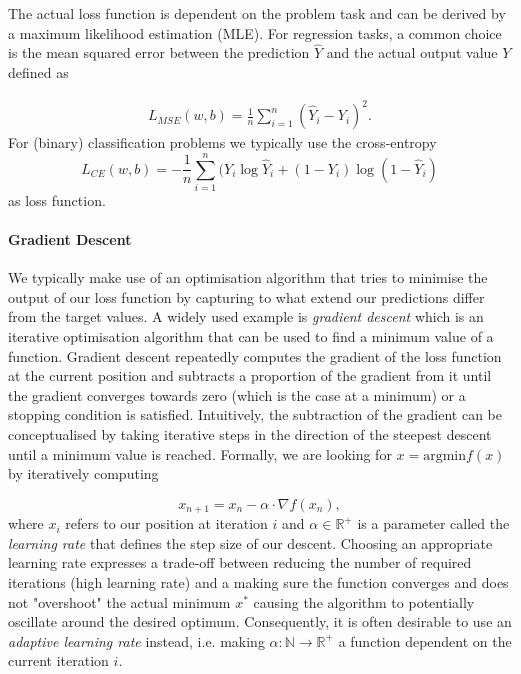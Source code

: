 The actual loss function is dependent on the problem task and can be derived by a maximum likelihood estimation (MLE). For regression tasks, a common choice is the mean squared error between the prediction $\hat{Y}$ and the actual output value $Y$ defined as 


\begin{align} 
L_{MSE}(w,b) = \frac{1}{n} \sum_{i=1}^{n}(\hat{Y}_i - Y_i)^2.
\end{align} 
For (binary) classification problems we typically use the cross-entropy
\begin{equation}
	L_{CE}(w,b) = - \frac{1}{n} \sum_{i=1}^{n} (Y_i \log \hat{Y}_i + (1 - Y_i) \log 
	(1- \hat{Y}_i)
\end{equation}
as loss function. 

\paragraph{Gradient Descent} We typically make use of an optimisation algorithm that tries to minimise the output of our loss function by capturing to what extend our predictions differ from the target values. A widely used example is \emph{gradient descent} which is an iterative optimisation algorithm that can be used to find a minimum value of a function. Gradient descent repeatedly computes the gradient of the loss function at the current position and subtracts a proportion of the gradient from it until the gradient converges towards zero (which is the case at a minimum) or a stopping condition is satisfied. Intuitively, the subtraction of the gradient can be conceptualised by taking iterative steps in the direction of the steepest descent until a minimum value is reached. 
Formally, we are looking for $x = \text{argmin} f(x)$ by iteratively computing

\begin{equation}	
	\label{eq:gradient-descent-update}
	x_{n+1} = x_n - \alpha \cdot \nabla f(x_n),
\end{equation}
where $x_i$ refers to our position at iteration $i$ and $\alpha \in \mathbb{R}^+$ is a parameter called the \emph{learning rate} that defines the step size of our descent. Choosing an appropriate learning rate expresses a trade-off between reducing the number of required iterations (high learning rate) and a making sure the function converges and does not "overshoot" the actual minimum $x^*$ causing the algorithm to potentially oscillate around the desired optimum. Consequently, it is often desirable to use an \emph{adaptive learning rate} instead, i.e. making $\alpha: \mathbb{N} \rightarrow \mathbb{R}^+$ a function dependent on the current iteration $i$. 

